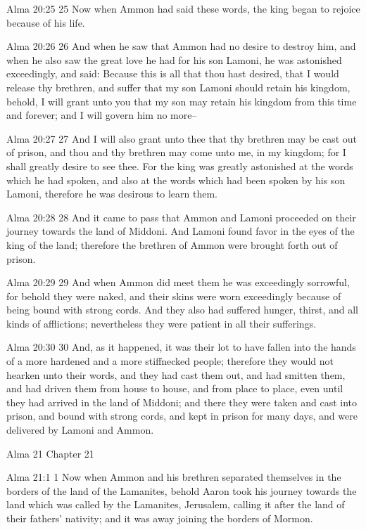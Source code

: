 Alma 20:25
 25 Now when Ammon had said these words, the king began to
rejoice because of his life.

Alma 20:26
 26 And when he saw that Ammon had no desire to destroy him, and
when he also saw the great love he had for his son Lamoni, he was
astonished exceedingly, and said: Because this is all that thou
hast desired, that I would release thy brethren, and suffer that
my son Lamoni should retain his kingdom, behold, I will grant
unto you that my son may retain his kingdom from this time and
forever; and I will govern him no more--

Alma 20:27
 27 And I will also grant unto thee that thy brethren may be cast
out of prison, and thou and thy brethren may come unto me, in my
kingdom; for I shall greatly desire to see thee. For the king
was greatly astonished at the words which he had spoken, and also
at the words which had been spoken by his son Lamoni, therefore
he was desirous to learn them.

Alma 20:28
 28 And it came to pass that Ammon and Lamoni proceeded on their
journey towards the land of Middoni. And Lamoni found favor in
the eyes of the king of the land; therefore the brethren of Ammon
were brought forth out of prison.

Alma 20:29
 29 And when Ammon did meet them he was exceedingly sorrowful,
for behold they were naked, and their skins were worn exceedingly
because of being bound with strong cords. And they also had
suffered hunger, thirst, and all kinds of afflictions;
nevertheless they were patient in all their sufferings.

Alma 20:30
 30 And, as it happened, it was their lot to have fallen into the
hands of a more hardened and a more stiffnecked people; therefore
they would not hearken unto their words, and they had cast them
out, and had smitten them, and had driven them from house to
house, and from place to place, even until they had arrived in
the land of Middoni; and there they were taken and cast into
prison, and bound with strong cords, and kept in prison for many
days, and were delivered by Lamoni and Ammon.

Alma 21
Chapter 21

Alma 21:1
 1 Now when Ammon and his brethren separated themselves in the
borders of the land of the Lamanites, behold Aaron took his
journey towards the land which was called by the Lamanites,
Jerusalem, calling it after the land of their fathers' nativity;
and it was away joining the borders of Mormon.

